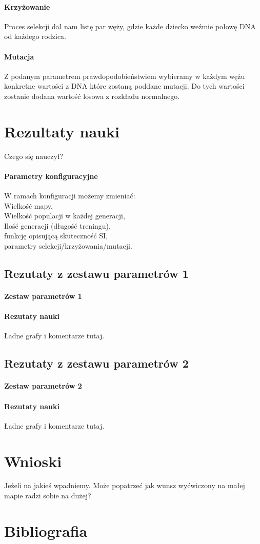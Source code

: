 \documentclass{article}
\begin{document}
\paragraph{Krzyżowanie}
Proces selekcji dał nam listę par węży, gdzie każde dziecko weźmie połowę DNA od każdego rodzica.
\paragraph{Mutacja}
Z podanym parametrem prawdopodobieństwiem  wybieramy w każdym wężu konkretne wartości z DNA które zostaną poddane mutacji.
Do tych wartości zostanie dodana wartość losowa z rozkładu normalnego.
\section{Rezultaty nauki}
Czego się nauczył?
\paragraph{Parametry konfiguracyjne}
W ramach konfiguracji możemy zmieniać: \\
Wielkość mapy, \\
Wielkość populacji w każdej generacji, \\
Ilość generacji (długość treningu), \\
funkcję opisującą skuteczność SI, \\
parametry selekcji/krzyżowania/mutacji.
\subsection{Rezutaty z zestawu parametrów 1}
\paragraph{Zestaw parametrów 1}
\paragraph{Rezutaty nauki}
Ładne grafy i komentarze tutaj.
\subsection{Rezutaty z zestawu parametrów 2}
\paragraph{Zestaw parametrów 2}
\paragraph{Rezutaty nauki}
Ładne grafy i komentarze tutaj.
\section{Wnioski} 
Jeżeli na jakieś wpadniemy.
Może popatrzeć jak wunsz wyćwiczony na małej mapie radzi sobie na dużej?
\section{Bibliografia}
\end{document}
